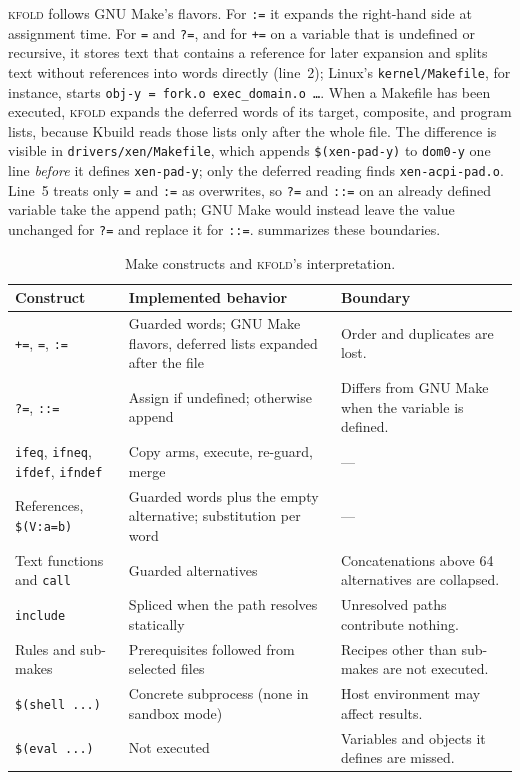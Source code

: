 \documentclass[acmsmall,screen,review]{acmart}
\newcommand{\tool}{\textsc{kfold}\xspace}
\begin{document}
\tool follows GNU Make's flavors. For \texttt{:=} it expands the right-hand side at assignment time. For \texttt{=} and \texttt{?=}, and for \texttt{+=} on a variable that is undefined or recursive, it stores text that contains a reference for later expansion and splits text without references into words directly (line~2); Linux's \texttt{kernel/Makefile}, for instance, starts \texttt{obj-y = fork.o exec\_domain.o \ldots}. When a Makefile has been executed, \tool expands the deferred words of its target, composite, and program lists, because Kbuild reads those lists only after the whole file. The difference is visible in \texttt{drivers/xen/Makefile}, which appends \texttt{\$(xen-pad-y)} to \texttt{dom0-y} one line \emph{before} it defines \texttt{xen-pad-y}; only the deferred reading finds \texttt{xen-acpi-pad.o}. Line~5 treats only \texttt{=} and \texttt{:=} as overwrites, so \texttt{?=} and \texttt{::=} on an already defined variable take the append path; GNU Make would instead leave the value unchanged for \texttt{?=} and replace it for \texttt{::=}.  summarizes these boundaries.

\begin{table}[t]
\centering\footnotesize
\caption{Make constructs and \tool's interpretation.}
\label{tab:scope}
\begin{tabular}{p{27mm}p{47mm}p{50mm}}
\toprule
Construct & Implemented behavior & Boundary \\
\midrule
\texttt{+=}, \texttt{=}, \texttt{:=} & Guarded words; GNU Make flavors, deferred lists expanded after the file & Order and duplicates are lost. \\
\texttt{?=}, \texttt{::=} & Assign if undefined; otherwise append & Differs from GNU Make when the variable is defined. \\
\texttt{ifeq}, \texttt{ifneq}, \texttt{ifdef}, \texttt{ifndef} & Copy arms, execute, re-guard, merge & --- \\
References, \texttt{\$(V:a=b)} & Guarded words plus the empty alternative; substitution per word & --- \\
Text functions and \texttt{call} & Guarded alternatives & Concatenations above 64 alternatives are collapsed. \\
\texttt{include} & Spliced when the path resolves statically & Unresolved paths contribute nothing. \\
Rules and sub-makes & Prerequisites followed from selected files & Recipes other than sub-makes are not executed. \\
\texttt{\$(shell ...)} & Concrete subprocess (none in sandbox mode) & Host environment may affect results. \\
\texttt{\$(eval ...)} & Not executed & Variables and objects it defines are missed. \\
\bottomrule
\end{tabular}
\end{table}
\end{document}
